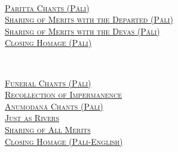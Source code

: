 {  \clearpage

  {\libertinusFont\selectfont\textbf{\textsc{\fontsize{18}{12}\selectfont{}}}}\\

  \textsc{\fontsize{14.4}{28}\selectfont
    \hyperref[deva-aradhana]{Paritta Chants (Pāli)} \ifdesktopversion\else\pageref{deva-aradhana}\fi\\
    \hyperref[sharing-merits-departed]{Sharing of Merits with the Departed (Pāli)} \ifdesktopversion\else\pageref{sharing-merits-departed}\fi\\
    \hyperref[sharing-merits-devas]{Sharing of Merits with the Devas (Pāli)} \ifdesktopversion\else\pageref{sharing-merits-devas}\fi\\
    \hyperref[closing-homage]{Closing Homage (Pāli)} \ifdesktopversion\else\pageref{closing-homage}\fi\\
  }

  \vspace{1.0cm}

  {\libertinusFont\selectfont\textbf{\textsc{\fontsize{18}{12}\selectfont{}}}}\\

  \textsc{\fontsize{14.4}{28}\selectfont
    \hyperref[pubba-bhaga-nama-kara-patho]{Funeral Chants (Pāli)} \ifdesktopversion\else\pageref{pubba-bhaga-nama-kara-patho}\fi\\
    \hyperref[recollection-of-impermanence]{Recollection of Impermanence} \ifdesktopversion\else\pageref{recollection-of-impermanence}\fi\\
    \hyperref[yatha-vari-vaha-pura]{Anumodanā Chants (Pāli)} \ifdesktopversion\else\pageref{yatha-vari-vaha-pura}\fi\\
    \hyperref[just-as-rivers]{Just as Rivers} \ifdesktopversion\else\pageref{just-as-rivers}\fi\\
    \hyperref[sharing-all-merits]{Sharing of All Merits} \ifdesktopversion\else\pageref{sharing-all-merits}\fi\\
    \hyperref[closing-homage]{Closing Homage (Pāli-English)} \ifdesktopversion\else\pageref{closing-homage}\fi\\
  }}
